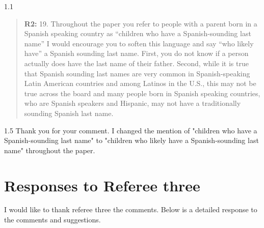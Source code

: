 \documentclass[12pt,english]{article}
\newcommand{\rrquote}{1.1}
\newcommand{\rrxspc}{1.5}
\begin{document}
\begin{refsection}
    \begin{spacing}{\rrquote}
        \begin{quotation}
        \textbf{R2: } 19. Throughout the paper you refer to people with a parent born in a Spanish speaking country as “children who have a Spanish-sounding last name” I would encourage you to soften this language and say “who likely have” a Spanish sounding last name. First, you do not know if a person actually does have the last name of their father. Second, while it is true that Spanish sounding last names are very common in Spanish-speaking Latin American countries and among Latinos in the U.S., this may not be true across the board and many people born in Spanish speaking countries, who are Spanish speakers and Hispanic, may not have a traditionally sounding Spanish last name.
    
        \end{quotation}
        \end{spacing}
        
        \begin{spacing}{\rrxspc}
            Thank you for your comment. I changed the mention of "children who have a Spanish-sounding last name" to "children who likely have a Spanish-sounding last name" throughout the paper.
    \end{spacing}
    \end{refsection}

    \clearpage
    \pagebreak

    \section{Responses to Referee three}
    I would like to thank referee three the comments. Below is a detailed response to the comments and suggestions.
\end{document}
